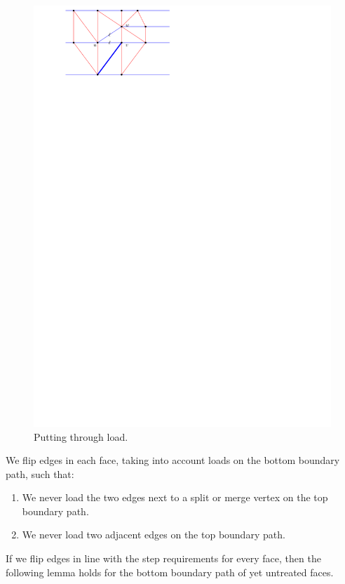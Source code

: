   \begin{figure}[h]
    \centering
    \includegraphics[scale=1]{blueFaceSubdivision/img/puttingthroughLoad.pdf}
    \caption{Putting through load.}
    \label{fig:subdiv:putTrougLoad}
  \end{figure}


  We flip edges in each face, taking into account loads on the bottom boundary path, such that:

  \begin{enumerate}
    \item We never load the two edges next to a split or merge vertex on the top boundary path.
    \item We never load two adjacent edges on the top boundary path.
  \end{enumerate}

  If we flip edges in line with the step requirements for every face, then the following lemma holds for the bottom boundary path of yet untreated faces.

